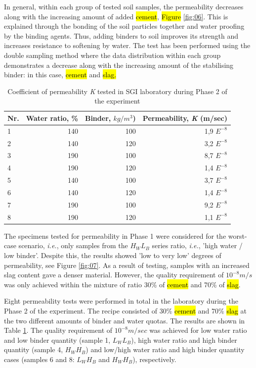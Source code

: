 \documentclass{amestyle}
\begin{document}
In general, within each group of tested soil samples, the permeability decreases along with the increasing amount of added \hl{cement}, \hl{Figure} \ref{fig:06}. This is explained through the bonding of the soil particles together and water proofing by the binding agents. Thus, adding binders to soil improves its strength and increases resistance to softening by water. The test has been performed using the double sampling method where the data distribution within each group demonstrates a decrease along with the increasing amount of the stabilising binder: in this case, \hl{cement} and \hl{slag.} 

\begin{table}[htbp]
  \caption{Coefficient of permeability \emph{K} tested in SGI laboratory during Phase 2 of the experiment}
  \label{tab:1}
  \centering
  \begin{tabular}{| l | r | r | r |}
    \hline
    \multicolumn{1}{|c|}{Nr.} &
    \multicolumn{1}{|c|}{Water ratio, \%} &
    \multicolumn{1}{|c|}{Binder, $kg/m^3$)} &
    \multicolumn{1}{|c|}{Permeability, \emph{K} (m/sec) } \\\hline
    1 & 140 & 100 & 1,9 $E^{-8}$ \\
    2 & 140 & 120 & 3,2 $E^{-8}$ \\
    3 & 190 & 100 & 8,7 $E^{-8}$ \\
    4 & 190 & 120 & 1,4 $E^{-8}$ \\
    5 & 140 & 100 & 3,7 $E^{-8}$ \\
    6 & 140 & 120 & 1,4 $E^{-8}$ \\
    7 & 190 & 100 & 9,2 $E^{-8}$ \\
    8 & 190 & 120 & 1,1 $E^{-8}$ \\\hline
  \end{tabular}
\end{table}

The specimens tested for permeability in Phase 1 were considered for the worst-case scenario, \emph{i.e.}, only samples from the $H_WL_B$ series ratio, \emph{i.e.}, 'high water / low binder'. Despite this, the results showed 'low to very low' degrees of permeability, see Figure \ref{fig:07}. As a result of testing, samples with an increased slag content gave a denser material. However, the quality requirement of $10^{-8} m/s$ was only achieved within the mixture of ratio 30\% of \hl{cement} and 70\% of \hl{slag}. 

Eight permeability tests were performed in total in the laboratory during the Phase 2 of the experiment. The recipe consisted of 30\% \hl{cement} and 70\% \hl{slag} at the two different amounts of binder and water quotas. The results are shown in Table \ref{tab:1}. The quality requirement of $10^{-8} m/sec$ was achieved for low water ratio and low binder quantity (sample 1, $L_WL_B$), high water ratio and high binder quantity (sample 4, $H_WH_B$) and low/high water ratio and high binder quantity cases (samples 6 and 8: $L_WH_B$ and $H_WH_B$), respectively. 
\end{document}
